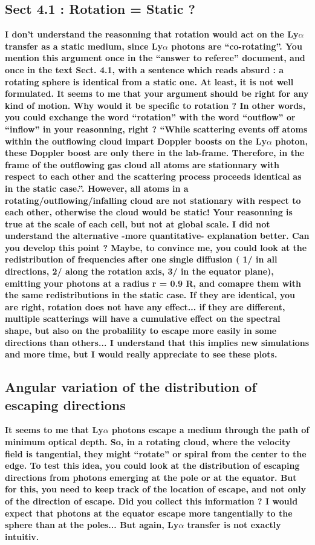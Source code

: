 \documentclass[12pt]{article}
\begin{document}
\subsection*{Sect 4.1 : Rotation = Static ?}

{\bf I don’t understand the reasonning that rotation would act on the Ly$\alpha$ transfer as a static medium, since Ly$\alpha$ photons are “co-rotating”. You mention this argument once in the “answer to referee” document, and once in the text Sect. 4.1, with a sentence which reads absurd : a rotating sphere is identical from a static one. At least, it is not well formulated.
It seems to me that your argument should be right for any kind of motion. Why would it be specific to rotation ? In other words, you could exchange the word “rotation” with the word “outflow” or “inflow” in your reasonning, right ? “While scattering events off atoms within the outflowing cloud impart Doppler boosts on the Ly$\alpha$ photon, these Doppler boost are only there in the lab-frame. Therefore, in the frame of the outflowing gas cloud all atoms are stationnary with respect to each other and the scattering process proceeds identical as in the static case.”. However, all atoms in a rotating/outflowing/infalling cloud are not stationary with respect to each other, otherwise the cloud would be static! Your reasonning is true at the scale of each cell, but not at global scale.
I did not understand the alternative -more quantitative- explanation better.
Can you develop this point ? Maybe, to convince me, you could look at the redistribution of frequencies after one single diffusion ( 1/ in all directions, 2/ along the rotation axis, 3/ in the equator plane), emitting your photons at a radius r = 0.9 R, and comapre them with the same redistributions in the static case. If they are identical, you are right, rotation does not have any effect... if they are different, multiple scatterings will have a cumulative effect on the spectral shape, but also on the probalility to escape more easily in some directions than others... I understand that this implies new simulations and more time, but I would really appreciate to see these plots. } 

\subsection*{Angular variation of the distribution of escaping directions}

{\bf It seems to me that Ly$\alpha$ photons escape a medium through the path of minimum optical depth. So, in a rotating cloud, where the velocity field is tangential, they might “rotate” or spiral from the center to the edge. To test this idea, you could look at the distribution of escaping directions from photons emerging at the pole or at the equator. But for this, you need to keep track of the location of escape, and not only of the direction of escape. Did you collect this information ?
I would expect that photons at the equator escape more tangentially to the sphere than at the poles... But again, Ly$\alpha$ transfer is not exactly intuitiv.}
\end{document}
